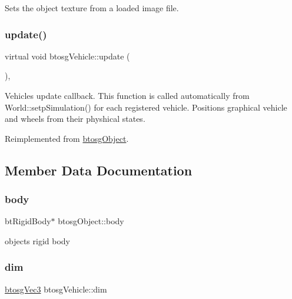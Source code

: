Sets the object texture from a loaded image file. \mbox{\label{classbtosgVehicle_a5fd0f471df492ac232c9b772a28bd2b9}} 
\subsubsection{\texorpdfstring{update()}{update()}}
{\footnotesize\ttfamily virtual void btosg\+Vehicle\+::update (\begin{DoxyParamCaption}{ }\end{DoxyParamCaption})\hspace{0.3cm}{\ttfamily [inline]}, {\ttfamily [virtual]}}

Vehicle\textquotesingle{}s update callback. This function is called automatically from World\+::setp\+Simulation() for each registered vehicle. Positions graphical vehicle and wheels from their physhical states. 

Reimplemented from \mbox{\hyperlink{classbtosgObject_a342917817dfde62554f83da8e0d5110b}{btosg\+Object}}.



\subsection{Member Data Documentation}
\mbox{\label{classbtosgObject_a64ccde0543c184ed1749fdb9c9699785}} 
\subsubsection{\texorpdfstring{body}{body}}
{\footnotesize\ttfamily bt\+Rigid\+Body$\ast$ btosg\+Object\+::body\hspace{0.3cm}{\ttfamily [inherited]}}



object\textquotesingle{}s rigid body 

\mbox{\label{classbtosgVehicle_a2173f99ca0719929aa5a1c890927aca3}} 
\subsubsection{\texorpdfstring{dim}{dim}}
{\footnotesize\ttfamily \mbox{\hyperlink{classbtosgVec3}{btosg\+Vec3}} btosg\+Vehicle\+::dim}



